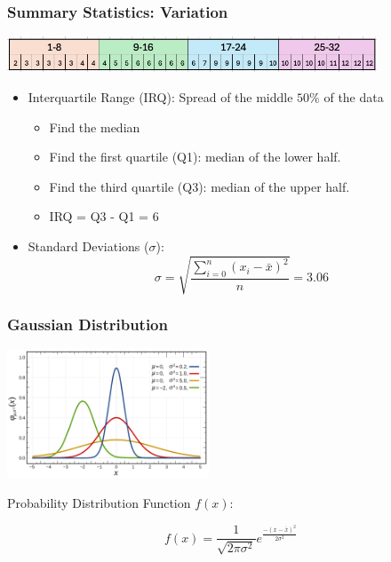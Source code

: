 \documentclass{beamer}
\begin{document}
\begin{frame}\frametitle{Summary Statistics: Variation}
\begin{center}
\includegraphics[width=11cm]{fig/stat3.jpg}
\end{center}
\begin{itemize}
\item Interquartile Range (IRQ): Spread of the middle $50\%$ of the data
\begin{itemize}
\item Find the median
\item Find the first quartile (Q1): median of the lower half.
\item Find the third quartile (Q3): median of the upper half.
\item IRQ = Q3 - Q1 = 6
\end{itemize}


\item Standard Deviations ($\sigma$):
\[ \sigma = \sqrt{ \frac{ \sum_{i=0}^n (x_i - \bar{x})^2}{n}} = 3.06\]

\end{itemize}

\end{frame}


\begin{frame}\frametitle{Gaussian Distribution}

\begin{center}
\includegraphics[width=6cm]{fig/stat4.png}
\end{center}

Probability Distribution Function $f(x)$:

\[ f(x) = \frac{1}{\sqrt{2 \pi \sigma^2}} e^{\frac{-(x-\bar{x})^2}{2 \sigma^2}} \]

\end{frame}
\end{document}
